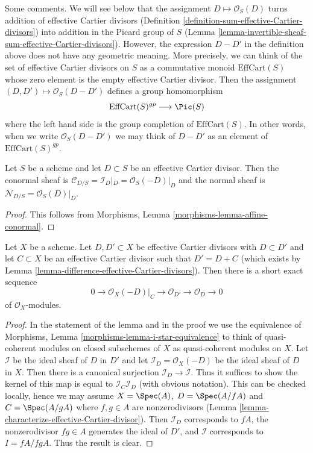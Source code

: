 \noindent
Some comments. We will see below that the assignment
$D \mapsto \mathcal{O}_S(D)$ turns addition of effective Cartier
divisors (Definition \ref{definition-sum-effective-Cartier-divisors})
into addition in the Picard group of $S$
(Lemma \ref{lemma-invertible-sheaf-sum-effective-Cartier-divisors}).
However, the expression $D - D'$ in the definition above does not
have any geometric meaning. More precisely, we can think of the
set of effective Cartier divisors on $S$ as a commutative monoid
$\text{EffCart}(S)$ whose zero element is the empty effective Cartier divisor.
Then the assignment $(D, D') \mapsto \mathcal{O}_S(D - D')$ defines
a group homomorphism
$$
\text{EffCart}(S)^{gp} \longrightarrow \Pic(S)
$$
where the left hand side is the group completion of
$\text{EffCart}(S)$. In other words, when we write $\mathcal{O}_S(D - D')$
we may think of $D - D'$ as an element of $\text{EffCart}(S)^{gp}$.

\begin{lemma}
\label{lemma-conormal-effective-Cartier-divisor}
Let $S$ be a scheme and let $D \subset S$ be an effective Cartier divisor.
Then the conormal sheaf is $\mathcal{C}_{D/S} = \mathcal{I}_D|_D =
\mathcal{O}_S(-D)|_D$ and the normal sheaf is
$\mathcal{N}_{D/S} = \mathcal{O}_S(D)|_D$.
\end{lemma}

\begin{proof}
This follows from Morphisms, Lemma \ref{morphisms-lemma-affine-conormal}.
\end{proof}

\begin{lemma}
\label{lemma-ses-add-divisor}
Let $X$ be a scheme. Let $D, D' \subset X$ be effective Cartier divisors
with $D \subset D'$ and let $C \subset X$ be an effective Cartier divisor
such that $D' = D + C$ (which exists by
Lemma \ref{lemma-difference-effective-Cartier-divisors}).
Then there is a short exact sequence
$$
0 \to \mathcal{O}_X(-D)|_C \to \mathcal{O}_{D'} \to \mathcal{O}_D \to 0
$$
of $\mathcal{O}_X$-modules.
\end{lemma}

\begin{proof}
In the statement of the lemma and in the proof we use the equivalence of
Morphisms, Lemma \ref{morphisms-lemma-i-star-equivalence} to think of
quasi-coherent modules on closed subschemes of $X$
as quasi-coherent modules on $X$. Let $\mathcal{I}$ be the ideal
sheaf of $D$ in $D'$ and let $\mathcal{I}_D = \mathcal{O}_X(-D)$ be
the ideal sheaf of $D$ in $X$. Then there is a canonical surjection
$\mathcal{I}_D \to \mathcal{I}$.
Thus it suffices to show the kernel of this map is equal to
$\mathcal{I}_C\mathcal{I}_D$ (with obvious notation).
This can be checked locally, hence we may assume
$X = \Spec(A)$, $D = \Spec(A/fA)$ and $C = \Spec(A/gA)$ where
$f, g \in A$ are nonzerodivisors
(Lemma \ref{lemma-characterize-effective-Cartier-divisor}).
Then $\mathcal{I}_D$ corresponds to $fA$, the nonzerodivisor $fg \in A$
generates the ideal of $D'$, and $\mathcal{I}$ corresponds to $I = fA/fgA$.
Thus the result is clear.
\end{proof}


